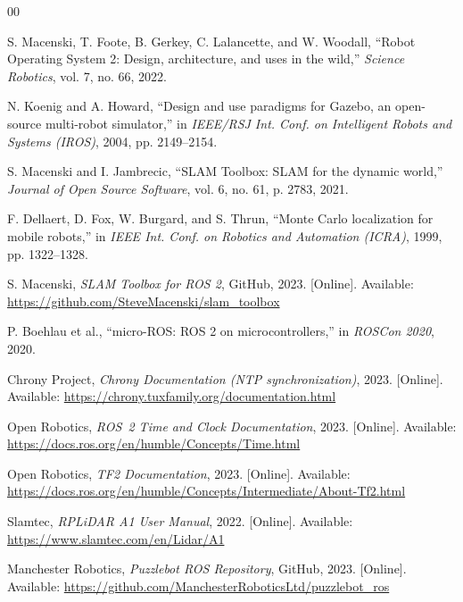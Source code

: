 \documentclass[conference]{IEEEtran}
\begin{document}

\begin{thebibliography}{00}

S. Macenski, T. Foote, B. Gerkey, C. Lalancette, and W. Woodall,
``Robot Operating System 2: Design, architecture, and uses in the wild,''
\textit{Science Robotics}, vol. 7, no. 66, 2022.

N. Koenig and A. Howard,
``Design and use paradigms for Gazebo, an open-source multi-robot simulator,''
in \textit{IEEE/RSJ Int. Conf. on Intelligent Robots and Systems (IROS)},
2004, pp. 2149--2154.

S. Macenski and I. Jambrecic,
``SLAM Toolbox: SLAM for the dynamic world,''
\textit{Journal of Open Source Software}, vol. 6, no. 61, p. 2783, 2021.

F. Dellaert, D. Fox, W. Burgard, and S. Thrun,
``Monte Carlo localization for mobile robots,''
in \textit{IEEE Int. Conf. on Robotics and Automation (ICRA)},
1999, pp. 1322--1328.

S. Macenski, \textit{SLAM Toolbox for ROS 2}, GitHub, 2023.
[Online]. Available: \url{https://github.com/SteveMacenski/slam_toolbox}

P. Boehlau et al., ``micro-ROS: ROS 2 on microcontrollers,''
in \textit{ROSCon 2020}, 2020.

Chrony Project, \textit{Chrony Documentation (NTP synchronization)},
2023. [Online]. Available: \url{https://chrony.tuxfamily.org/documentation.html}

Open Robotics, \textit{ROS~2 Time and Clock Documentation},
2023. [Online]. Available:
\url{https://docs.ros.org/en/humble/Concepts/Time.html}

Open Robotics, \textit{TF2 Documentation},
2023. [Online]. Available:
\url{https://docs.ros.org/en/humble/Concepts/Intermediate/About-Tf2.html}

Slamtec, \textit{RPLiDAR A1 User Manual},
2022. [Online]. Available: \url{https://www.slamtec.com/en/Lidar/A1}

Manchester Robotics, \textit{Puzzlebot ROS Repository}, GitHub, 2023.
[Online]. Available:
\url{https://github.com/ManchesterRoboticsLtd/puzzlebot_ros}

\end{thebibliography}
\end{document}
